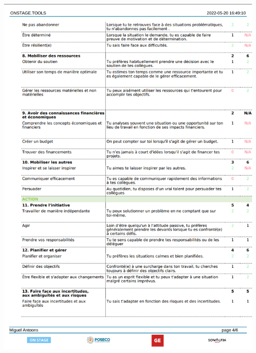 \documentclass[11pt]{article}
\begin{document}
\includegraphics*[scale=0.34]{Screenshot from 2022-05-22 21-04-19.png}

\newpage
\end{document}
